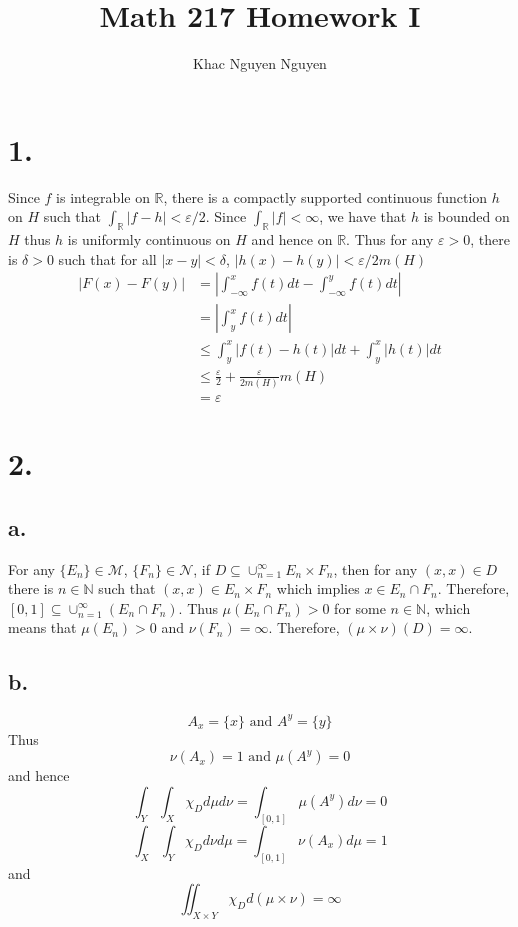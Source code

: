\documentclass[11pt]{article}
\title{\textbf{Math 217 Homework I}}
\author{Khac Nguyen Nguyen}
\date{}
\theoremstyle{mystyle}
\theoremstyle{definition}
\begin{document}
\section*{1.}
Since $f$ is integrable on $\mathbb{R}$, there is a compactly supported continuous function $h$ on $H$ such that $\int_\mathbb{R} |f-h|< \varepsilon/2$. Since $\int_{\mathbb{R}} |f| < \infty$, we have that $h$ is bounded on $H$ thus $h$ is uniformly continuous on $H$ and hence on $\mathbb{R}$. Thus for any $\varepsilon > 0$, there is $\delta > 0$ such that for all $|x-y|< \delta$, $|h(x)-h(y)| < \varepsilon/2m(H)$   
\begin{align*}
  |F(x) - F(y)|  
  &= \left|\int_{-\infty}^x f(t) dt - \int_{-\infty}^y f(t) dt \right| \\
  &= \left|\int_y^x f(t) dt \right| \\
  &\le \int_y^x |f(t) - h(t)| dt + \int_y^x |h(t)| dt \\
  &\le \displaystyle\frac{\varepsilon}{2} + \displaystyle\frac{\varepsilon}{2m(H)} m(H) \\
  &= \varepsilon
\end{align*}
\newpage
\section*{2.}
\subsection*{a.}
For any $\{E_n\} \in \mathcal{M}$, $\{F_n\} \in \mathcal{N}$, if $D \subseteq \cup_{n=1}^\infty E_n \times F_n$, then for any $(x,x) \in D$ there is $n \in \mathbb{N}$ such that $(x,x) \in E_n \times F_n$ which implies $x \in E_n \cap F_n$. Therefore, $[0,1] \subseteq \cup_{n=1}^\infty (E_n \cap F_n)$. Thus $\mu(E_n \cap F_n) > 0$ for some $n \in \mathbb{N}$, which means that $\mu(E_n) > 0$ and $\nu(F_n) = \infty$. Therefore, $(\mu \times \nu)(D) = \infty$.
\subsection*{b.}
\[
  A_x = \{x\} \text{ and } A^y = \{y\}
\]
Thus 
\[
  \nu(A_x) = 1 \text{ and } \mu(A^y) = 0
\]
and hence
\[
  \int_Y \int_X \chi_D d\mu d\nu = \int_{[0,1]} \mu(A^y) d\nu = 0
\]
\[
  \int_X \int_Y \chi_D d\nu d\mu = \int_{[0,1]} \nu(A_x) d\mu = 1
\]
and 
\[
  \iint_{X \times Y} \chi_D d(\mu \times \nu) = \infty
\]
\newpage
\end{document}
